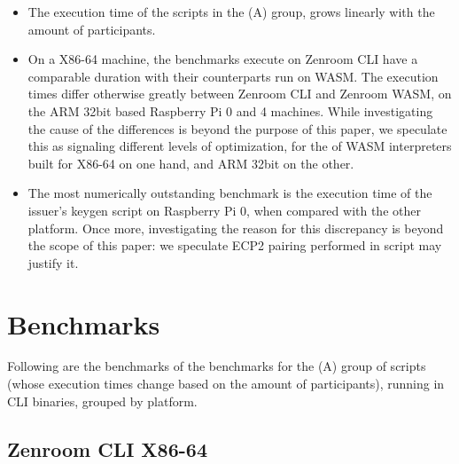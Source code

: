 \documentclass[twocolumn]{article}
\begin{document}
\begin{itemize}
\item The execution time of the scripts in the (A) group, grows linearly with the amount of participants. 

\item On a X86-64 machine, the benchmarks execute on Zenroom CLI have a comparable duration with their counterparts run on WASM. The execution times differ otherwise greatly between Zenroom CLI and Zenroom WASM, on the ARM 32bit based Raspberry Pi 0 and 4 machines. 
While investigating the cause of the differences is beyond the purpose of this paper, we speculate this as signaling different levels of optimization, for the of WASM interpreters built for X86-64 on one hand, and ARM 32bit on the other.  

\item The most numerically outstanding benchmark is the execution time of the issuer's keygen script on Raspberry Pi 0, when compared with the other platform. Once more, investigating the reason for this discrepancy is beyond the scope of this paper: we speculate ECP2 pairing performed in script may justify it.
\end{itemize}




\onecolumn
\section{Benchmarks}
\label{sec:benchmarks}

Following are the benchmarks of the benchmarks for the (A) group of scripts (whose execution times change based on the amount of participants), running in CLI binaries, grouped by platform.


\subsection*{Zenroom CLI X86-64}
\end{document}
